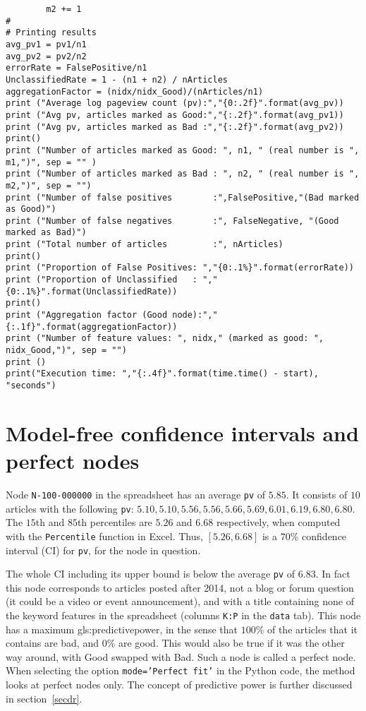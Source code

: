\documentclass[oneside,10pt]{book}
\begin{document}
\begin{lstlisting}
        m2 += 1
#
# Printing results
avg_pv1 = pv1/n1
avg_pv2 = pv2/n2
errorRate = FalsePositive/n1
UnclassifiedRate = 1 - (n1 + n2) / nArticles
aggregationFactor = (nidx/nidx_Good)/(nArticles/n1)
print ("Average log pageview count (pv):","{0:.2f}".format(avg_pv))
print ("Avg pv, articles marked as Good:","{:.2f}".format(avg_pv1))
print ("Avg pv, articles marked as Bad :","{:.2f}".format(avg_pv2))
print()
print ("Number of articles marked as Good: ", n1, " (real number is ", m1,")", sep = "" )
print ("Number of articles marked as Bad : ", n2, " (real number is ", m2,")", sep = "")
print ("Number of false positives        :",FalsePositive,"(Bad marked as Good)")
print ("Number of false negatives        :", FalseNegative, "(Good marked as Bad)")
print ("Total number of articles         :", nArticles)
print()
print ("Proportion of False Positives: ","{0:.1%}".format(errorRate))
print ("Proportion of Unclassified   : ","{0:.1%}".format(UnclassifiedRate))
print()
print ("Aggregation factor (Good node):","{:.1f}".format(aggregationFactor))
print ("Number of feature values: ", nidx," (marked as good: ", nidx_Good,")", sep = "")
print ()
print("Execution time: ","{:.4f}".format(time.time() - start), "seconds")
\end{lstlisting}

\section{Model-free confidence intervals and perfect nodes}


Node \texttt{N-100-000000} in the spreadsheet has an average
\texttt{pv} of $5.85$. It consists of $10$ articles with
the following \texttt{pv}: $5.10, 5.10, 5.56, 5.56, 5.66, 5.69, 6.01,  6.19, 6.80, 6.80$. The $15$th and $85$th percentiles are $5.26$ and $6.68$ respectively, when computed with the \texttt{Percentile} function in Excel. Thus, $[5.26, 6.68]$ is a $70\%$ \textcolor{index}{confidence interval} (CI) for \texttt{pv}, for the node
 in question.


The whole CI including its upper bound is below the average \texttt{pv} of $6.83$. In fact this node corresponds to articles posted after 2014, not a blog or forum question (it could be a video or event announcement), and with a title containing none of the keyword features in the spreadsheet
(columns \texttt{K:P} in the \texttt{data} tab). This node  has a maximum \gls{gls:predictivepower}, in the sense that $100\%$ of the articles that it contains are bad, and $0\%$
 are good. This would also be true if it was the other way around, with Good swapped with Bad. Such a node is called a \textcolor{index}{perfect node}. When selecting the option
\texttt{mode='Perfect fit'} in the Python code,
the method looks at perfect nodes only. The concept of \textcolor{index}{predictive power} is further discussed in section~\ref{secdr}.
\end{document}
